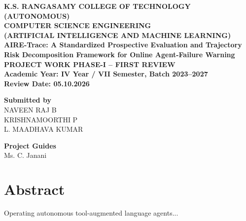 \documentclass[12pt,a4paper]{article}
\begin{document}
\begin{titlepage}
    \begin{center}
        \vspace*{1cm}
        \textbf{\Large K.S. RANGASAMY COLLEGE OF TECHNOLOGY} \\[0.5em]
        \textbf{\large (AUTONOMOUS)} \\[2cm]
        
        \textbf{\large COMPUTER SCIENCE ENGINEERING} \\[0.5em]
        \textbf{\large (ARTIFICIAL INTELLIGENCE AND MACHINE LEARNING)} \\[2cm]
        
        \textbf{\Large AIRE-Trace: A Standardized Prospective Evaluation and Trajectory Risk Decomposition Framework for Online Agent-Failure Warning} \\[1.5cm]
        
        \textbf{\large PROJECT WORK PHASE-I -- FIRST REVIEW} \\[0.5em]
        \textbf{\large Academic Year: IV Year / VII Semester, Batch 2023--2027} \\[0.5em]
        \textbf{\large Review Date: 05.10.2026} \\[2.5cm]
    \end{center}
    
    \begin{minipage}[t]{0.45\textwidth}
        \begin{flushleft}
            \textbf{Submitted by} \\[0.5em]
            NAVEEN RAJ B \\
            KRISHNAMOORTHI P \\
            L. MAADHAVA KUMAR
        \end{flushleft}
    \end{minipage}
    \hfill
    \begin{minipage}[t]{0.45\textwidth}
        \begin{flushright}
            \textbf{Project Guides} \\[0.5em]
            Ms. C. Janani
        \end{flushright}
    \end{minipage}
    
\end{titlepage}

\section{Abstract}
Operating autonomous tool-augmented language agents...
\end{document}
